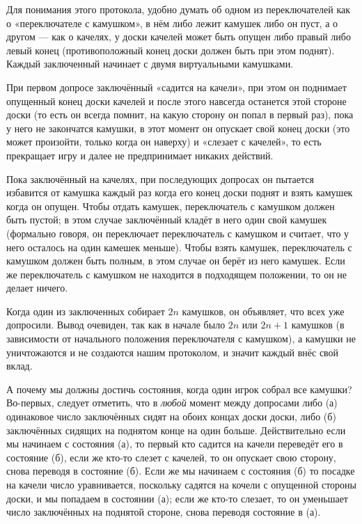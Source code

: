 Для понимания этого протокола, удобно думать об одном из переключателей как о «переключателе с камушком», в нём либо лежит камушек либо он пуст, а о другом --- как о качелях, у доски качелей может быть опущен либо правый либо  левый конец (противоположный конец доски должен быть при этом поднят).
Каждый заключенный начинает с двумя виртуальными камушками.

При первом допросе заключённый «садится на качели», при этом он поднимает опущенный конец доски качелей и
после этого навсегда останется этой стороне доски (то есть он всегда помнит, на какую сторону он попал в первый раз), пока у него не закончатся камушки, в этот момент он опускает свой конец доски (это может произойти, только когда он наверху) и «слезает с качелей», то есть прекращает игру и далее не предпринимает никаких действий.

Пока заключённый на качелях,
при последующих допросах он пытается избавится от камушка каждый раз когда его конец доски поднят
и взять камушек когда он опущен.
Чтобы отдать камушек, переключатель с камушком должен быть пустой;
в этом случае заключённый 
кладёт в него один свой камушек (формально говоря, он переключает переключатель с камушком и считает, что у него осталось на один камешек меньше).
Чтобы взять камушек, переключатель с камушком должен быть полным, в этом случае он берёт из него камушек.
Если же переключатель с камушком не находится в подходящем положении, то он не делает ничего.

Когда один из заключенных собирает $2n$ камушков, он объявляет, что всех уже допросили.
Вывод очевиден, так как в начале было $2n$ или $2n+1$ камушков (в зависимости от начального положения переключателя с камушком), а камушки не уничтожаются и не создаются нашим протоколом, и значит каждый внёс свой вклад.

А почему мы должны достичь состояния, когда один игрок собрал все камушки?
Во-первых, следует отметить, что в \emph{любой} момент между допросами либо 
(а) одинаковое число заключённых сидят на обоих концах доски доски, либо 
(б) заключённых сидящих на поднятом конце на один больше.
Действительно если мы начинаем с состояния (а), то первый кто садится на качели переведёт его в состояние (б), если же кто-то слезет с качелей, то он опускает свою сторону, снова переводя в состояние (б).
Если же мы начинаем с состояния (б) то посадке на качели число уравнивается, поскольку садятся на кочели с опущенной стороны доски, и мы попадаем в состоянии (а);
если же кто-то слезает, то он уменьшает число заключённых на поднятой стороне, снова переводя состояние в (а).


